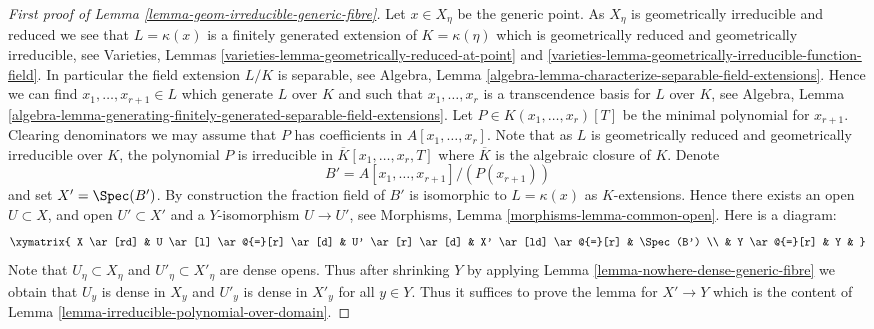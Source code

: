 \begin{proof}[First proof of Lemma \ref{lemma-geom-irreducible-generic-fibre}]
\medskip\noindent
Let $x \in X_\eta$ be the generic point. As $X_\eta$ is geometrically
irreducible and reduced we see that $L = \kappa(x)$ is a finitely generated
extension of $K = \kappa(\eta)$ which is geometrically reduced and
geometrically irreducible, see
Varieties, Lemmas \ref{varieties-lemma-geometrically-reduced-at-point} and
\ref{varieties-lemma-geometrically-irreducible-function-field}.
In particular the field extension $L/K$ is separable, see
Algebra, Lemma \ref{algebra-lemma-characterize-separable-field-extensions}.
Hence we can find $x_1, \ldots, x_{r + 1} \in L$ which generate $L$
over $K$ and such that $x_1, \ldots, x_r$ is a transcendence basis for
$L$ over $K$, see
Algebra, Lemma
\ref{algebra-lemma-generating-finitely-generated-separable-field-extensions}.
Let $P \in K(x_1, \ldots, x_r)[T]$ be the minimal polynomial for
$x_{r + 1}$. Clearing denominators we may assume that
$P$ has coefficients in $A[x_1, \ldots, x_r]$.
Note that as $L$ is geometrically reduced and geometrically irreducible
over $K$, the polynomial $P$ is irreducible in
$\overline{K}[x_1, \ldots, x_r, T]$ where $\overline{K}$ is the
algebraic closure of $K$. Denote
$$
B' = A[x_1, \ldots, x_{r + 1}]/(P(x_{r + 1}))
$$
and set $X' = \Spec(B')$. By construction the fraction field of $B'$
is isomorphic to $L = \kappa(x)$ as $K$-extensions. Hence there exists an
open $U \subset X$, and open $U' \subset X'$ and a $Y$-isomorphism
$U \to U'$, see
Morphisms, Lemma \ref{morphisms-lemma-common-open}.
Here is a diagram:
$$
\xymatrix{
X \ar[rd] &
U \ar[l] \ar@{=}[r] \ar[d] &
U' \ar[r] \ar[d] &
X' \ar[ld] \ar@{=}[r] & \Spec(B') \\
& Y \ar@{=}[r] & Y &
}
$$
Note that $U_\eta \subset X_\eta$ and $U'_\eta \subset X'_\eta$ are
dense opens. Thus after shrinking $Y$ by applying
Lemma \ref{lemma-nowhere-dense-generic-fibre}
we obtain that $U_y$ is dense in $X_y$ and $U'_y$ is dense in $X'_y$
for all $y \in Y$. Thus it suffices to prove the lemma for
$X' \to Y$ which is the content of
Lemma \ref{lemma-irreducible-polynomial-over-domain}.
\end{proof}

